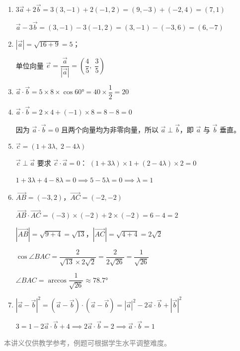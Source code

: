 \documentclass[12pt, a4paper]{ctexart}
\begin{document}
\begin{knowledgebox}[参考答案]
\begin{enumerate}[label=\textbf{\arabic*.}, leftmargin=2em]
  \item $3\vec{a}+2\vec{b} = 3(3,-1)+2(-1,2) = (9,-3)+(-2,4) = (7,1)$

        $\vec{a}-3\vec{b} = (3,-1)-3(-1,2) = (3,-1)-(-3,6) = (6,-7)$

  \item $|\vec{a}| = \sqrt{16+9} = 5$；

        单位向量 $\vec{e} = \dfrac{\vec{a}}{|\vec{a}|} = \left(\dfrac{4}{5},\; \dfrac{3}{5}\right)$

  \item $\vec{a}\cdot\vec{b} = 5\times 8\times\cos 60° = 40\times\dfrac{1}{2} = 20$

  \item $\vec{a}\cdot\vec{b} = 2\times 4 + (-1)\times 8 = 8-8 = 0$

        因为 $\vec{a}\cdot\vec{b}=0$ 且两个向量均为非零向量，所以 $\vec{a}\perp\vec{b}$，即 $\vec{a}$ 与 $\vec{b}$ 垂直。

  \item $\vec{c} = (1+3\lambda,\; 2-4\lambda)$

        $\vec{c}\perp\vec{a}$ 要求 $\vec{c}\cdot\vec{a}=0$：
        $(1+3\lambda)\times 1 + (2-4\lambda)\times 2 = 0$

        $1+3\lambda + 4-8\lambda = 0 \implies 5-5\lambda = 0 \implies \lambda = 1$

  \item $\overrightarrow{AB}=(-3,2)$，$\overrightarrow{AC}=(-2,-2)$

        $\overrightarrow{AB}\cdot\overrightarrow{AC} = (-3)\times(-2)+2\times(-2) = 6-4 = 2$

        $|\overrightarrow{AB}|=\sqrt{9+4}=\sqrt{13}$，$|\overrightarrow{AC}|=\sqrt{4+4}=2\sqrt{2}$

        $\cos\angle BAC = \dfrac{2}{\sqrt{13}\times 2\sqrt{2}} = \dfrac{2}{2\sqrt{26}} = \dfrac{1}{\sqrt{26}}$

        $\angle BAC = \arccos\dfrac{1}{\sqrt{26}} \approx 78.7°$

  \item $|\vec{a}-\vec{b}|^2 = (\vec{a}-\vec{b})\cdot(\vec{a}-\vec{b})
        = |\vec{a}|^2 - 2\vec{a}\cdot\vec{b} + |\vec{b}|^2$

        $3 = 1 - 2\vec{a}\cdot\vec{b} + 4 \implies 2\vec{a}\cdot\vec{b} = 2 \implies \vec{a}\cdot\vec{b} = 1$
\end{enumerate}
\end{knowledgebox}

\vfill
\begin{center}
\small\textcolor{gray}{本讲义仅供教学参考，例题可根据学生水平调整难度。}
\end{center}
\end{document}
